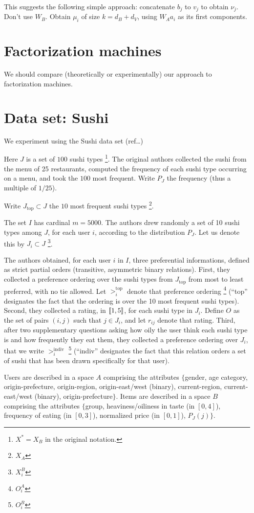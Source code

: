 \documentclass[version=last, pagesize, twoside=off, bibliography=totoc, DIV=calc, fontsize=14pt, a4paper, french, english]{scrartcl}
\begin{document}
This suggests the following simple approach: concatenate $b_j$ to $v_j$ to obtain $\nu_j$. Don’t use $W_B$. Obtain $\mu_i$ of size $k = d_B + d_V$, using $W_A a_i$ as its first components.

\section{Factorization machines}
We should compare (theoretically or experimentally) our approach to factorization machines.

\section{Data set: Sushi}
We experiment using the Sushi data set (ref…)

Here $J$ is a set of $100$ sushi types \footnote{$X^*=X_B$ in the original notation.}. The original authors collected the sushi from the menu of 25 restaurants, computed the frequency of each sushi type occurring on a menu, and took the $100$ most frequent. Write $P_J$ the frequency (thus a multiple of $1/25$).

Write $J_\text{top} \subset J$ the $10$ most frequent sushi types \footnote{$X_A$}.

The set $I$ has cardinal $m = 5000$. The authors drew randomly a set of 10 sushi types among $J$, for each user $i$, according to the distribution $P_J$. Let us denote this by $J_i \subset J$ \footnote{$X^B_i$}.

The authors obtained, for each user $i$ in $I$, three preferential informations, defined as strict partial orders (transitive, asymmetric binary relations). First, they collected a preference ordering over the sushi types from $J_\text{top}$ from most to least preferred, with no tie allowed. Let $>^\text{top}_i$ denote that preference ordering \footnote{$O^A_i$} (“top” designates the fact that the ordering is over the 10 most frequent sushi types). Second, they collected a rating, in $\lbrack\!\lbrack{}1, 5\rbrack\!\rbrack$, for each sushi type in $J_i$. Define $O$ as the set of pairs $(i, j)$ such that $j \in J_i$, and let $r_{ij}$ denote that rating. Third, after two supplementary questions asking how oily the user think each sushi type is and how frequently they eat them, they collected a preference ordering over $J_i$, that we write $>^\text{indiv}_i$ \footnote{$O^B_i$} (“indiv” designates the fact that this relation orders a set of sushi that has been drawn specifically for that user).

Users are described in a space $A$ comprising the attributes $\{$gender, age category, origin-prefecture, origin-region, origin-east/west (binary), current-region, current-east/west (binary), origin-prefecture$\}$. Items are described in a space $B$ comprising the attributes $\{$group, heaviness/oiliness in taste (in $[0, 4]$), frequency of eating (in $[0, 3]$), normalized price (in $[0, 1]$), $P_J(j)$$\}$.
\end{document}
